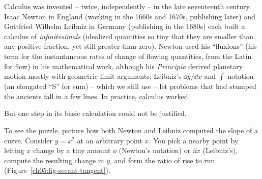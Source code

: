 Calculus was invented --
twice, independently -- in the late seventeenth century. Isaac Newton in England (working in
the 1660s and 1670s, publishing later) and Gottfried Wilhelm Leibniz in Germany (publishing in
the 1680s) each built a calculus of \emph{infinitesimals} (idealized quantities so tiny that
they are smaller than any positive fraction, yet still greater than zero). Newton used his
``fluxions'' (his term for the instantaneous rates of
change of flowing quantities, from the Latin for flow) in his mathematical work, although his
\emph{Principia} derived planetary motion mostly with geometric limit arguments;
Leibniz's $\dd y/\dd x$ and $\int$ notation (an elongated ``S'' for sum) -- which we
still use -- let problems that had stumped the ancients fall in a few lines. In practice,
calculus worked.

But one step in its basic calculation could not be justified.

To see the puzzle, picture how both Newton and Leibniz computed the slope of a curve.
Consider $y = x^2$ at an arbitrary point $x$. You pick a nearby point by letting $x$ change by
a tiny amount $o$ (Newton's notation) or $\dd x$ (Leibniz's), compute the resulting change in
$y$, and form the ratio of rise to run (Figure~\ref{ch05:fig-secant-tangent}).

